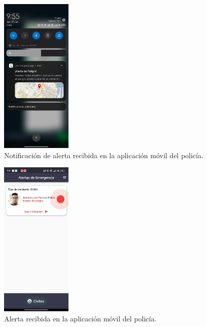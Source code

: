 \begin{figure}[H]
    \centering
    \includegraphics[width=0.3\textwidth]{chapters/III-resultados-y-discusion/resources/images/notificacion-recibida-policia.jpeg}
    \caption{Notificación de alerta recibida en la aplicación móvil del policía.}
    \label{fig:notificacion-recibida-movil-policia}
\end{figure}

\begin{figure}[H]
    \centering
    \includegraphics[width=0.3\textwidth]{chapters/III-resultados-y-discusion/resources/images/alerta-recibida-policia.png}
    \caption{Alerta recibida en la aplicación móvil del policía.}
    \label{fig:alerta-recibida-movil-policia}
\end{figure}

